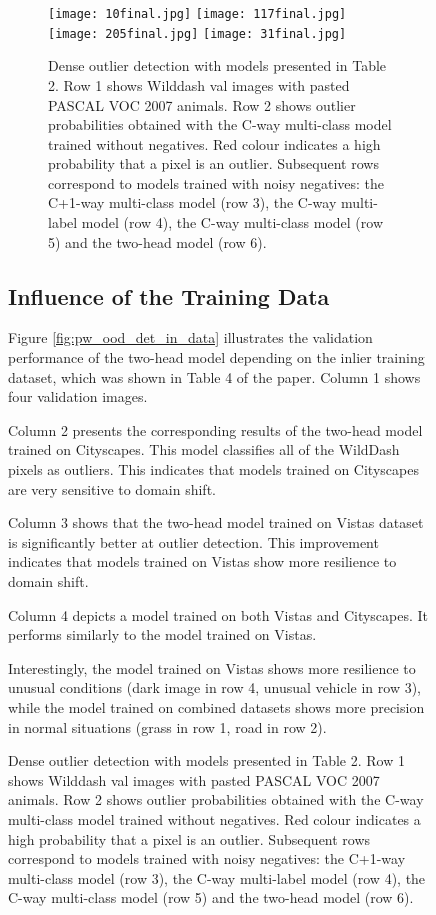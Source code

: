 \documentclass[runningheads]{llncs}
\begin{document}
\begin{figure}[htb]
\begin{figure}[htb!]
  \centering
  \texttt{[image: 10final.jpg]}
  \texttt{[image: 117final.jpg]}
  \texttt{[image: 205final.jpg]}
  \texttt{[image: 31final.jpg]}
  \caption{Dense outlier detection 
  with models presented in Table 2.
  Row 1 shows Wilddash val images with 
  pasted PASCAL VOC 2007 animals. 
  Row 2 shows outlier probabilities 
  obtained with the C-way multi-class model
  trained without negatives.
  Red colour indicates a high probability 
  that a pixel is an outlier.
  Subsequent rows correspond 
  to models trained with noisy negatives:
  the C+1-way multi-class model (row 3), 
  the C-way multi-label model (row 4), 
  the C-way multi-class model (row 5) and 
  the two-head model (row 6). 
  }
  \label{fig:pw_ood_det_models}
\end{figure}

\subsection{Influence of the Training Data}
Figure \ref{fig:pw_ood_det_in_data} illustrates the
validation performance of the two-head model
depending on the inlier training dataset, which 
was shown in Table 4 of the paper.
Column 1 shows four validation images.

Column 2 presents the corresponding results 
of the two-head model trained on Cityscapes.
This model classifies
all of the WildDash pixels as outliers. 
This indicates that models trained on Cityscapes are
very sensitive to domain shift. 

Column 3 shows that the two-head model trained
on Vistas dataset is significantly better
at outlier detection. This improvement indicates that 
models trained on Vistas show more resilience
to domain shift.

Column 4 depicts a model trained 
on both Vistas and Cityscapes. 
It performs similarly to the model 
trained on Vistas.

Interestingly, the model
trained on Vistas shows more resilience to unusual
conditions (dark image in row 4, unusual vehicle in 
row 3), while the model trained on combined datasets 
shows more precision in normal situations
(grass in row 1, road in row 2).


\end{figure}
\end{document}
